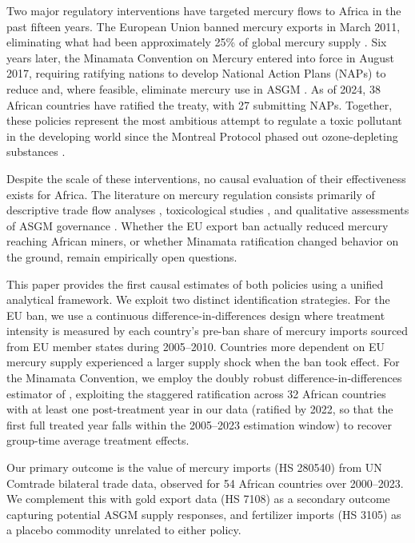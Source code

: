 \documentclass[12pt]{article}
\begin{document}
Two major regulatory interventions have targeted mercury flows to Africa in the past fifteen years. The European Union banned mercury exports in March 2011, eliminating what had been approximately 25\% of global mercury supply \citep{ec2008mercury}. Six years later, the Minamata Convention on Mercury entered into force in August 2017, requiring ratifying nations to develop National Action Plans (NAPs) to reduce and, where feasible, eliminate mercury use in ASGM \citep{cossart2019minamata}. As of 2024, 38 African countries have ratified the treaty, with 27 submitting NAPs. Together, these policies represent the most ambitious attempt to regulate a toxic pollutant in the developing world since the Montreal Protocol phased out ozone-depleting substances \citep{murdoch2003international}.

Despite the scale of these interventions, no causal evaluation of their effectiveness exists for Africa. The literature on mercury regulation consists primarily of descriptive trade flow analyses \citep{fritz2022smuggling, de2011effect}, toxicological studies \citep{basu2015mercury}, and qualitative assessments of ASGM governance \citep{bansah2018small}. Whether the EU export ban actually reduced mercury reaching African miners, or whether Minamata ratification changed behavior on the ground, remain empirically open questions.

This paper provides the first causal estimates of both policies using a unified analytical framework. We exploit two distinct identification strategies. For the EU ban, we use a continuous difference-in-differences design where treatment intensity is measured by each country's pre-ban share of mercury imports sourced from EU member states during 2005--2010. Countries more dependent on EU mercury supply experienced a larger supply shock when the ban took effect. For the Minamata Convention, we employ the doubly robust difference-in-differences estimator of \citet{callaway2021difference}, exploiting the staggered ratification across 32 African countries with at least one post-treatment year in our data (ratified by 2022, so that the first full treated year falls within the 2005--2023 estimation window) to recover group-time average treatment effects.

Our primary outcome is the value of mercury imports (HS 280540) from UN Comtrade bilateral trade data, observed for 54 African countries over 2000--2023. We complement this with gold export data (HS 7108) as a secondary outcome capturing potential ASGM supply responses, and fertilizer imports (HS 3105) as a placebo commodity unrelated to either policy.
\end{document}
